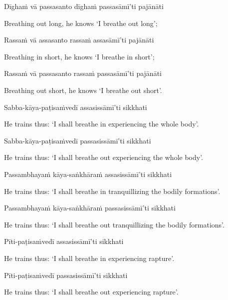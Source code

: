 Dīghaṁ vā passasanto dīghaṁ passasāmī'ti pajānāti

\begin{english}
  Breathing out long, he knows `I breathe out long';
\end{english}

Rassaṁ vā assasanto rassaṁ assasāmī'ti pajānāti

\begin{english}
  Breathing in short, he knows `I breathe in short';
\end{english}

Rassaṁ vā passasanto rassaṁ passasāmī'ti pajānāti

\begin{english}
  Breathing out short, he knows `I breathe out short'.
\end{english}

Sabba-kāya-paṭisaṁvedī assasissāmī'ti sikkhati

\begin{english}
  He trains thus: `I shall breathe in experiencing the whole body'.
\end{english}

Sabba-kāya-paṭisaṁvedī passasissāmī'ti sikkhati

\begin{english}
  He trains thus: `I shall breathe out experiencing the whole body'.
\end{english}

Passambhayaṁ kāya-saṅkhāraṁ assasissāmī'ti sikkhati

\begin{english}
  He trains thus: `I shall breathe in tranquillizing the bodily formations'.
\end{english}

Passambhayaṁ kāya-saṅkhāraṁ passasissāmī'ti sikkhati

\begin{english}
  He trains thus: `I shall breathe out tranquillizing the bodily formations'.
\end{english}

Pīti-paṭisaṁvedī assasissāmī'ti sikkhati

\begin{english}
  He trains thus: `I shall breathe in experiencing rapture'.
\end{english}

Pīti-paṭisaṁvedī passasissāmī'ti sikkhati

\begin{english}
  He trains thus: `I shall breathe out experiencing rapture'.
\end{english}

